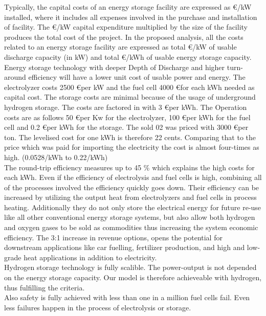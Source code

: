 \begin{parcolumns}[colwidths={1=2.5 cm, 2=10 cm, 3=2.5cm}]{3}
{Typically, the capital costs of an energy storage facility are expressed as \euro /kW installed, where it includes all expenses involved in the purchase and installation of facility. The \euro /kW capital expenditure multiplied by the size of the facility produces the total cost of the project. In the proposed analysis, all the costs related to an energy storage facility are expressed as total \euro /kW of usable discharge capacity (in kW) and total \euro /kWh of usable energy storage capacity. Energy storage technology with deeper Depth of Discharge and higher turn-around efficiency will have a lower unit cost of usable power and energy. The electrolyzer costs 2500 \euro per kW and the fuel cell 4000 \euro for each kWh needed as capital cost. The storage costs are minimal because of the usage of underground hydrogen storage. The costs are factored in with 3 \euro per kWh.  The Operation costs are as follows 50 \euro per Kw for the electrolyzer, 100 \euro per kWh for the fuel cell and 0.2 \euro per kWh for the storage. The sold 02 was priced with 3000 \euro per ton.  The levelised cost for one kWh is therefore 22 cents. Comparing that to the price which was paid for importing the electricity the cost is almost four-times as high. (0.0528/kWh to 0.22/kWh) \\

The round-trip efficiency measures up to 45 \% which explains the high costs for each kWh. Even if the efficiency of electrolysis and fuel cells is high, combining all of the processes involved the efficiency quickly goes down.  Their efficiency can be increased by utilizing the output heat from electrolyzers and fuel cells in process heating. Additionally they do not only store the electrical energy for future re-use like all other conventional energy storage systems, but also allow both hydrogen and oxygen gases to be sold as commodities thus increasing the system economic efficiency. The 3:1 increase in revenue options, opens the potential for downstream
applications like car fuelling, fertilizer production, and high and low-grade heat applications in addition to electricity. \\

Hydrogen storage technology is fully scalible. The power-output is not depended on the energy storage capacity. Our model is therefore achieveable with hydrogen, thus fulfilling the criteria. \\

Also safety is fully achieved with less than one in a million fuel cells fail. Even less failures happen in the process of electrolysis or storage. \\

}
\end{parcolumns}
